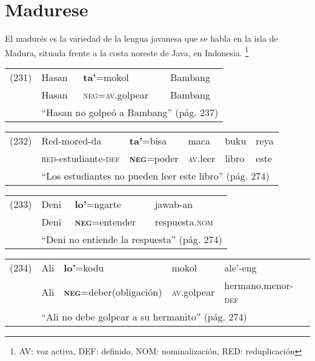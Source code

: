 \section*{Madurese}

\noindent El madurés es la variedad de la lengua javanesa que se habla en la isla de Madura, situada frente a la costa noreste de Java, en Indonesia.
\footnote{AV: voz activa, DEF: definido, NOM: nominalización, RED: reduplicación}
\vspace{0.5cm}

{\setmainfont{Charis SIL} 

\begin{tabular}{llll}
(231) & Hasan & \textbf{ta'}=mokol & Bambang \\
& Hasan & \textsc{neg=av}.golpear & Bambang \\
& \multicolumn{3}{l}{``Hasan no golpeó a Bambang'' (pág. 237)}
\end{tabular} \vspace{0.5cm}

\begin{tabular}{llllll}
(232) & Red-mored-da & \textbf{ta'}=bisa & maca & buku & reya \\
& \textsc{red-}estudiante-\textsc{def} & \textsc{\textbf{neg}}=poder & \textsc{av.}leer & libro & este \\
& \multicolumn{5}{l}{``Los estudiantes no pueden leer este libro'' (pág. 274)}
\end{tabular} \vspace{0.5cm}

\begin{tabular}{llll}
(233) & Deni & \textbf{lo'}=ngarte & jawab-an \\
& Deni & \textsc{\textbf{neg}=}entender & respuesta.\textsc{nom} \\
& \multicolumn{3}{l}{``Deni no entiende la respuesta'' (pág. 274)} 
\end{tabular} \vspace{0.5cm}

\begin{tabular}{lllll}
(234) & Ali & \textbf{lo'}=kodu & mokol & ale'-eng \\
& Ali & \textsc{\textbf{neg}}=deber(obligación) & \textsc{av.}golpear & hermano.menor-\textsc{def} \\
& \multicolumn{4}{l}{``Ali no debe golpear a su hermanito'' (pág. 274)}
\end{tabular} \vspace{0.5cm}

}
